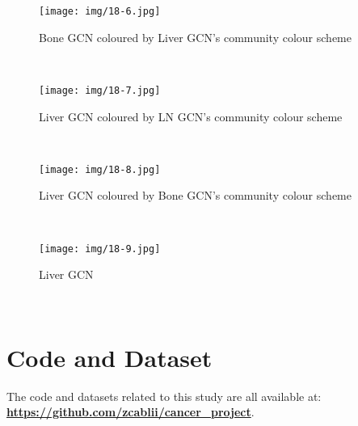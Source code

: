 \documentclass[12pt,a4paper]{report}
\begin{document}
\begin{figure}[h!]
\centering
\texttt{[image: img/18-6.jpg]}
\caption{Bone GCN coloured by Liver GCN's community colour scheme}
\end{figure}\\


\begin{figure}[h!]
\centering
\texttt{[image: img/18-7.jpg]}
\caption{Liver GCN coloured by LN GCN's community colour scheme}
\end{figure}\\


\begin{figure}[h!]
\centering
\texttt{[image: img/18-8.jpg]}
\caption{Liver GCN coloured by Bone GCN's community colour scheme}
\end{figure}\\


\begin{figure}[h!]
\centering
\texttt{[image: img/18-9.jpg]}
\caption{Liver GCN}
\end{figure}\\


\chapter{Code and Dataset}
The code and datasets related to this study are all available at: \\ \textbf{\href{https://github.com/zcablii/cancer_project}{https://github.com/zcablii/cancer\_project}}. \\
\end{document}
